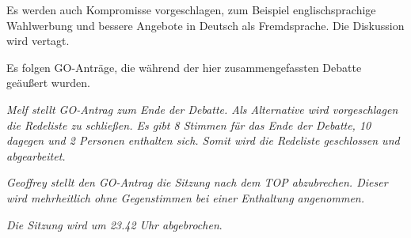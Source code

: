 \documentclass[ngerman,headheight=70pt]{scrartcl}
\begin{document}
    Es werden auch Kompromisse vorgeschlagen, zum Beispiel englischsprachige
    Wahlwerbung und bessere Angebote in Deutsch als Fremdsprache. Die Diskussion
    wird vertagt.

    Es folgen GO-Anträge, die während der hier zusammengefassten Debatte geäußert
    wurden.

    \textit{Melf stellt GO-Antrag zum Ende der Debatte. Als Alternative wird
    vorgeschlagen die Redeliste zu schließen. Es gibt 8 Stimmen für das Ende
    der Debatte, 10 dagegen und 2 Personen enthalten sich. Somit wird die
    Redeliste geschlossen und abgearbeitet.}

    \textit{Geoffrey stellt den GO-Antrag die Sitzung nach dem TOP abzubrechen.
    Dieser wird mehrheitlich ohne Gegenstimmen bei einer Enthaltung angenommen.}

    \textit{Die Sitzung wird um 23.42 Uhr abgebrochen}.
\end{document}

